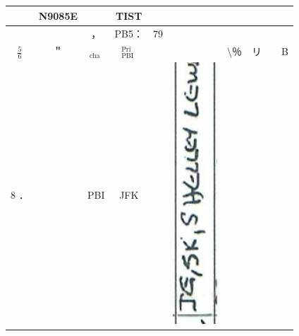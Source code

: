 \documentclass[10pt]{article}
\begin{document}
\begin{center}
\begin{tabular}{|c|c|c|c|c|c|c|c|c|c|}
 & N9085E &  & TIST &  &  &  &  &  &  \\
\hline
 &  & ， & PB5： & 79 &  &  &  &  &  \\
\hline
\(\frac{5}{6}\) & ＂ & \({ }_{\text {cha }}\) & \({ }_{\text {PBI }}^{\text {Pri }}\) &  &  & \textbackslash ％ & リ &  & B \\
\hline
8 ． &  & PBI & JFK &  & \includegraphics[max width=\textwidth]{2025_02_27_dd68c3d38de88f0516d9g-096(5)}

\end{tabular}
\end{center}
\end{document}
